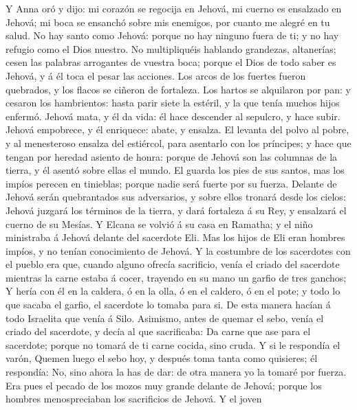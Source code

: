  Y Anna oró y dijo: mi corazón se regocija en Jehová, mi
cuerno es ensalzado en Jehová; mi boca se ensanchó sobre mis enemigos,
por cuanto me alegré en tu salud.  No hay santo como
Jehová: porque no hay ninguno fuera de ti; y no hay refugio como el Dios
nuestro.  No multipliquéis hablando grandezas, altanerías;
cesen las palabras arrogantes de vuestra boca; porque el Dios de todo
saber es Jehová, y á él toca el pesar las acciones.  Los
arcos de los fuertes fueron quebrados, y los flacos se ciñeron de
fortaleza.  Los hartos se alquilaron por pan: y cesaron
los hambrientos: hasta parir siete la estéril, y la que tenía muchos
hijos enfermó.  Jehová mata, y él da vida: él hace
descender al sepulcro, y hace subir.  Jehová empobrece, y
él enriquece: abate, y ensalza.  El levanta del polvo al
pobre, y al menesteroso ensalza del estiércol, para asentarlo con los
príncipes; y hace que tengan por heredad asiento de honra: porque de
Jehová son las columnas de la tierra, y él asentó sobre ellas el mundo.
 El guarda los pies de sus santos, mas los impíos perecen
en tinieblas; porque nadie será fuerte por su fuerza. 
Delante de Jehová serán quebrantados sus adversarios, y sobre ellos
tronará desde los cielos: Jehová juzgará los términos de la tierra, y
dará fortaleza á su Rey, y ensalzará el cuerno de su Mesías.
 Y Elcana se volvió á su casa en Ramatha; y el niño
ministraba á Jehová delante del sacerdote Eli.  Mas los
hijos de Eli eran hombres impíos, y no tenían conocimiento de Jehová.
 Y la costumbre de los sacerdotes con el pueblo era que,
cuando alguno ofrecía sacrificio, venía el criado del sacerdote mientras
la carne estaba á cocer, trayendo en su mano un garfio de tres ganchos;
 Y hería con él en la caldera, ó en la olla, ó en el
caldero, ó en el pote; y todo lo que sacaba el garfio, el sacerdote lo
tomaba para si. De esta manera hacían á todo Israelita que venía á Silo.
 Asimismo, antes de quemar el sebo, venía el criado del
sacerdote, y decía al que sacrificaba: Da carne que ase para el
sacerdote; porque no tomará de ti carne cocida, sino cruda.
 Y si le respondía el varón, Quemen luego el sebo hoy, y
después toma tanta como quisieres; él respondía: No, sino ahora la has
de dar: de otra manera yo la tomaré por fuerza.  Era pues
el pecado de los mozos muy grande delante de Jehová; porque los hombres
menospreciaban los sacrificios de Jehová.  Y el joven

